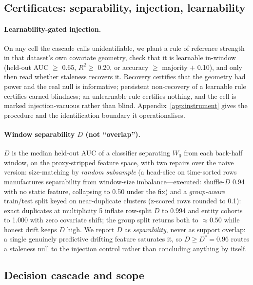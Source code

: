 \documentclass[10pt]{article} %
\begin{document}
\subsection{Certificates: separability, injection, learnability}\label{sec:certificates}

\paragraph{Learnability-gated injection.} On any cell the cascade calls unidentifiable, we
plant a rule of reference strength in that dataset's own covariate geometry, check that it is
learnable in-window (held-out AUC $\ge$ 0.65, $R^2 \ge$ 0.20, or accuracy $\ge$ majority $+$ 0.10),
and only then read whether staleness recovers it. Recovery certifies that the geometry had power
and the real null is informative; persistent non-recovery of a learnable rule certifies earned
blindness; an unlearnable rule certifies nothing, and the cell is marked injection-vacuous rather
than blind. Appendix~\ref{app:instrument} gives the procedure and the identification boundary it
operationalises.

\paragraph{Window separability $D$ (not ``overlap'').} $D$ is the median held-out AUC of a classifier
separating $W_0$ from each back-half window, on the proxy-stripped feature space, with two
repairs over the naive version: size-matching by \emph{random subsample} (a head-slice on
time-sorted rows manufactures separability from window-size imbalance---executed: shuffle-$D$
0.94 with no static feature, collapsing to 0.50 under the fix) and a \emph{group-aware} train/test
split keyed on near-duplicate clusters (z-scored rows rounded to 0.1): exact duplicates at
multiplicity 5 inflate row-split $D$ to 0.994 and entity cohorts to 1.000 with zero covariate
shift; the group split returns both to $\approx 0.50$ while honest drift keeps $D$ high. We report $D$ as
\emph{separability}, never as support overlap: a single genuinely predictive drifting feature
saturates it, so $D \ge D^{\ast} = 0.96$ routes a staleness null to the injection control rather than
concluding anything by itself.

\subsection{Decision cascade and scope}\label{sec:cascade}
\end{document}
